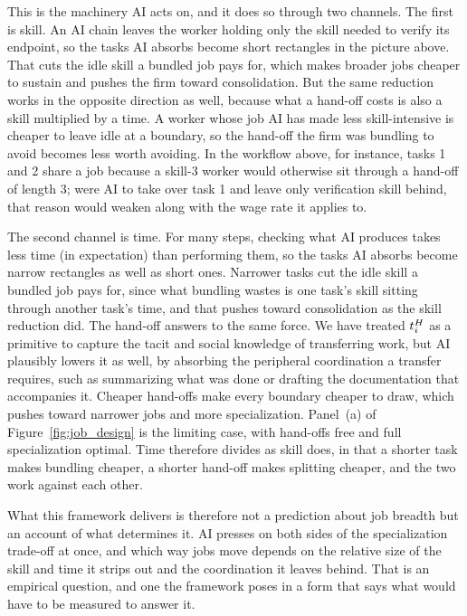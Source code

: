 This is the machinery AI acts on, and it does so through two channels.
The first is skill. An AI chain leaves the worker holding only the skill needed to verify its endpoint, so the tasks AI absorbs become short rectangles in the picture above.
That cuts the idle skill a bundled job pays for, which makes broader jobs cheaper to sustain and pushes the firm toward consolidation.
But the same reduction works in the opposite direction as well, because what a hand-off costs is also a skill multiplied by a time. A worker whose job AI has made less skill-intensive is cheaper to leave idle at a boundary, so the hand-off the firm was bundling to avoid becomes less worth avoiding.
In the workflow above, for instance, tasks 1 and 2 share a job because a skill-$3$ worker would otherwise sit through a hand-off of length $3$; were AI to take over task 1 and leave only verification skill behind, that reason would weaken along with the wage rate it applies to.

The second channel is time.
For many steps, checking what AI produces takes less time (in expectation) than performing them, so the tasks AI absorbs become narrow rectangles as well as short ones.
Narrower tasks cut the idle skill a bundled job pays for, since what bundling wastes is one task's skill sitting through another task's time, and that pushes toward consolidation as the skill reduction did.
The hand-off answers to the same force.
We have treated $t^{H}_{i}$ as a primitive to capture the tacit and social knowledge of transferring work, but AI plausibly lowers it as well, by absorbing the peripheral coordination a transfer requires, such as summarizing what was done or drafting the documentation that accompanies it.
Cheaper hand-offs make every boundary cheaper to draw, which pushes toward narrower jobs and more specialization.
Panel~(a) of Figure~\ref{fig:job_design} is the limiting case, with hand-offs free and full specialization optimal.
Time therefore divides as skill does, in that a shorter task makes bundling cheaper, a shorter hand-off makes splitting cheaper, and the two work against each other.

What this framework delivers is therefore not a prediction about job breadth but an account of what determines it.
AI presses on both sides of the specialization trade-off at once, and which way jobs move depends on the relative size of the skill and time it strips out and the coordination it leaves behind.
That is an empirical question, and one the framework poses in a form that says what would have to be measured to answer it.